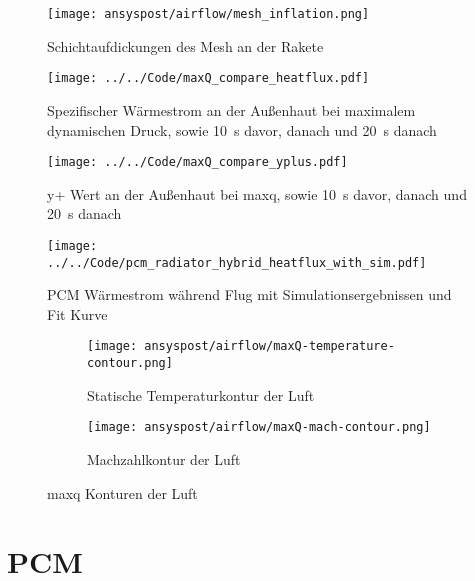 \begin{figure}[H]
  \centering
  \texttt{[image: ansyspost/airflow/mesh\_inflation.png]}
  \caption{Schichtaufdickungen des Mesh an der Rakete}\label{fig:aussenstroemung_mesh_inflationlayers}
\end{figure}

\begin{figure}[H]
  \centering
  \texttt{[image: ../../Code/maxQ\_compare\_heatflux.pdf]}
  \caption{Spezifischer Wärmestrom an der Außenhaut bei maximalem dynamischen Druck, sowie \SI{10}{s} davor, danach und \SI{20}{s} danach}\label{fig:spezifischer_waermestrom_maxQ_simulationen}
\end{figure}

\begin{figure}[H]
  \centering
  \texttt{[image: ../../Code/maxQ\_compare\_yplus.pdf]}
  \caption{y+ Wert an der Außenhaut bei \ac{maxq}, sowie \SI{10}{s} davor, danach und \SI{20}{s} danach}\label{fig:yplus_maxQ_simulationen}
\end{figure}

\begin{figure}[H]
  \centering
  \texttt{[image: ../../Code/pcm\_radiator\_hybrid\_heatflux\_with\_sim.pdf]}
  \caption{PCM Wärmestrom während Flug mit Simulationsergebnissen und Fit Kurve}\label{fig:pcm_waermestrom_sim}
\end{figure}

\begin{figure}[H]
    \centering

    \begin{subfigure}{\textwidth}
        \centering
        \texttt{[image: ansyspost/airflow/maxQ-temperature-contour.png]}
        \caption{Statische Temperaturkontur der Luft}
        \label{fig:maxQ_temp_contour}
    \end{subfigure}

    \begin{subfigure}{\textwidth}
        \centering
        \texttt{[image: ansyspost/airflow/maxQ-mach-contour.png]}
        \caption{Machzahlkontur der Luft}
        \label{fig:maxQ_mach_contour}
    \end{subfigure}

    \caption{\texorpdfstring{\ac{maxq}}{max Q} Konturen der Luft}
    \label{fig:maxQ_konturen}
\end{figure}

\section{PCM}\label{sec:sim_pcm}

